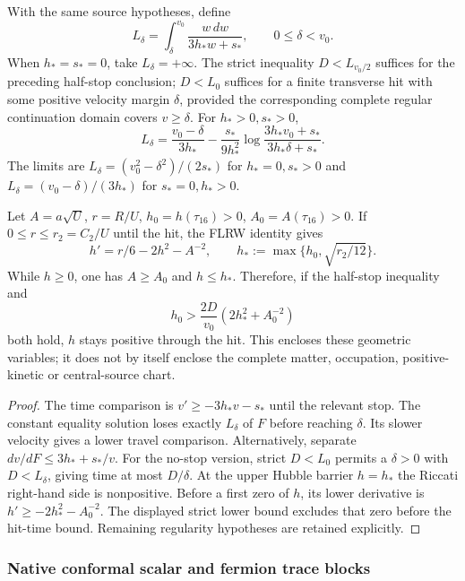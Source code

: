\documentclass[12pt,a4paper]{article}
\begin{document}
\begin{corollary}
\label{p8:cor:v2189-c06-sharp-chart}
With the same source hypotheses, define
\[
 L_\delta=\int_\delta^{v_0}
 \frac{w\,dw}{3h_*w+s_*},\qquad 0\le\delta<v_0.
\]
When $h_*=s_*=0$, take $L_\delta=+\infty$.
The strict inequality $D<L_{v_0/2}$ suffices for the preceding half-stop
conclusion; $D<L_0$ suffices for a finite transverse hit with some positive
velocity margin $\delta$, provided the corresponding complete regular
continuation domain covers $v\ge\delta$. For $h_*>0,s_*>0$,
\[
 L_\delta=\frac{v_0-\delta}{3h_*}
 -\frac{s_*}{9h_*^2}
 \log\frac{3h_*v_0+s_*}{3h_*\delta+s_*}.
\]
The limits are $L_\delta=(v_0^2-\delta^2)/(2s_*)$ for $h_*=0,s_*>0$
and $L_\delta=(v_0-\delta)/(3h_*)$ for $s_*=0,h_*>0$.

Let $A=a\sqrt U$, $r=R/U$, $h_0=h(\tau_{16})>0$, $A_0=A(\tau_{16})>0$.
If $0\le r\le r_2=C_2/U$ until the hit, the FLRW identity gives
\[
 h'=r/6-2h^2-A^{-2},\qquad
 h_*:=\max\{h_0,\sqrt{r_2/12}\}.
\]
While $h\ge0$, one has $A\ge A_0$ and $h\le h_*$. Therefore, if the
half-stop inequality and
\[
 h_0>\frac{2D}{v_0}(2h_*^2+A_0^{-2})
\]
both hold, $h$ stays positive through the hit. This encloses these
geometric variables; it does not by itself enclose the complete matter,
occupation, positive-kinetic or central-source chart.
\end{corollary}
\begin{proof}
The time comparison is $v'\ge-3h_*v-s_*$ until the relevant stop.
The constant equality solution loses exactly $L_\delta$ of $F$ before
reaching $\delta$. Its slower velocity gives a lower travel comparison.
Alternatively, separate $dv/dF\le3h_*+s_*/v$. For the no-stop version,
strict $D<L_0$ permits a $\delta>0$ with $D<L_\delta$, giving time
at most $D/\delta$. At the upper Hubble barrier $h=h_*$ the Riccati
right-hand side is nonpositive. Before a first zero of $h$, its lower
derivative is $h'\ge-2h_*^2-A_0^{-2}$. The displayed strict lower
bound excludes that zero before the hit-time bound. Remaining regularity
hypotheses are retained explicitly.
\end{proof}

\subsubsection{Native conformal scalar and fermion trace blocks}
\label{p8:sec:v2189-c06-native-blocks}
\end{document}
